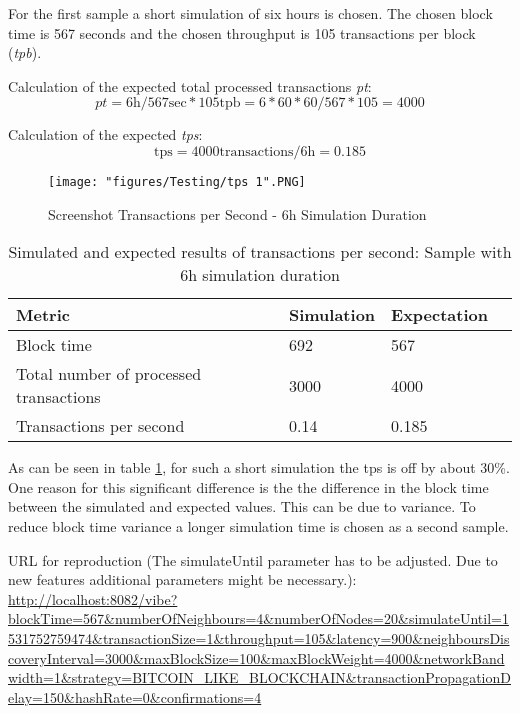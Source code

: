 For the first sample a short simulation of six hours is chosen. The chosen block time is 567 seconds and the chosen throughput is 105 transactions per block (\textit{tpb}).

Calculation of the expected total processed transactions \textit{pt}:
\begin{equation}
\textit{pt} = 6 \text{h} / 567 \text{sec} * 105 \text{tpb} = 6*60*60/567 * 105 = 4000
\end{equation}

Calculation of the expected \textit{tps}:
\begin{equation}
\text{tps} = 4000 \text{transactions} / 6 \text{h} = 0.185
\end{equation}

\begin{figure}
\centering
\texttt{[image: "figures/Testing/tps 1".PNG]}
\caption{Screenshot Transactions per Second - 6h Simulation Duration\label{fig:tpsSimulation6h}}
\end{figure}

\begin{table}[ht]
\begin{adjustbox}{width=0.8\textwidth}
    \begin{tabular}{| l | l | l | l |}
    \hline
    \textbf{Metric} & \textbf{Simulation} & \textbf{Expectation}\\ \hline
    Block time & 692 & 567\\ \hline
    Total number of processed transactions & 3000 & 4000 \\ \hline
    Transactions per second & 0.14 & 0.185\\ \hline
    \end{tabular}
\end{adjustbox}
    \caption{Simulated and expected results of transactions per second: Sample with 6h simulation duration\label{table:tps6hsimulation}}
\end{table} 

As can be seen in table \ref{table:tps6hsimulation}, for such a short simulation the tps is off by about 30\%. One reason for this significant difference is the the difference in the block time between the simulated and expected values. This can be due to variance. To reduce block time variance a longer simulation time is chosen as a second sample.

URL for reproduction (The simulateUntil parameter has to be adjusted. Due to new features additional parameters might be necessary.):\linebreak
\url{http://localhost:8082/vibe?blockTime=567&numberOfNeighbours=4&numberOfNodes=20&simulateUntil=1531752759474&transactionSize=1&throughput=105&latency=900&neighboursDiscoveryInterval=3000&maxBlockSize=100&maxBlockWeight=4000&networkBandwidth=1&strategy=BITCOIN_LIKE_BLOCKCHAIN&transactionPropagationDelay=150&hashRate=0&confirmations=4} 

